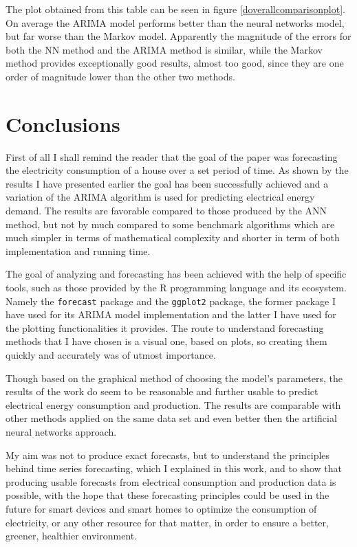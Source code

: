 \documentclass[12pt,a4paper,titlepage]{report}
\begin{document}
The plot obtained from this table can be seen in figure \ref{doverallcomparisonplot}. On average the ARIMA model performs better than the neural networks model, but far worse than the Markov model. Apparently the magnitude of the errors for both the NN method and the ARIMA method is similar, while the Markov method provides exceptionally good results, almost too good, since they are one order of magnitude lower than the other two methods.

\section{Conclusions}
First of all I shall remind the reader that the goal of the paper was forecasting the electricity consumption of a house over a set period of time. As shown by the results I have presented earlier the goal has been successfully achieved and a variation of the ARIMA algorithm is used for predicting electrical energy demand. The results are favorable compared to those produced by the ANN method, but not by much compared to some benchmark algorithms which are much simpler in terms of mathematical complexity and shorter in term of both implementation and running time.

The goal of analyzing and forecasting has been achieved with the help of specific tools, such as those provided by the R programming language and its ecosystem. Namely the \texttt{forecast} package and the \texttt{ggplot2} package, the former package I have used for its ARIMA model implementation and the latter I have used for the plotting functionalities it provides. The route to understand forecasting methods that I have chosen is a visual one, based on plots, so creating them quickly and accurately was of utmost importance.

Though based on the graphical method of choosing the model's parameters, the results of the work do seem to be reasonable and further usable to predict electrical energy consumption and production. The results are comparable with other methods applied on the same data set and even better then the artificial neural networks approach.

My aim was not to produce exact forecasts, but to understand the principles behind time series forecasting, which I explained in this work, and to show that producing usable forecasts from electrical consumption and production data is possible, with the hope that these forecasting principles could be used in the future for smart devices and smart homes to optimize the consumption of electricity, or any other resource for that matter,  in order to ensure a better, greener, healthier environment. 
\end{document}
